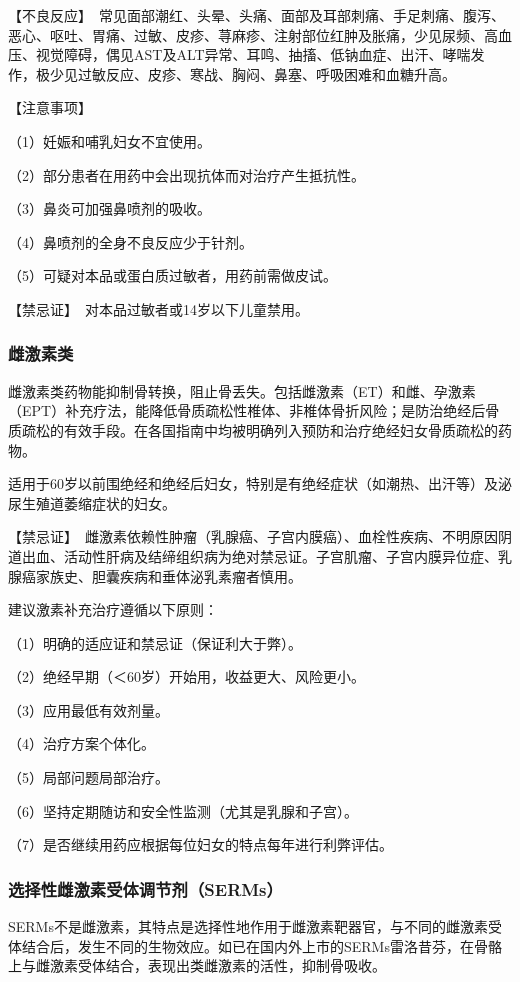 【不良反应】　常见面部潮红、头晕、头痛、面部及耳部刺痛、手足刺痛、腹泻、恶心、呕吐、胃痛、过敏、皮疹、荨麻疹、注射部位红肿及胀痛，少见尿频、高血压、视觉障碍，偶见AST及ALT异常、耳鸣、抽搐、低钠血症、出汗、哮喘发作，极少见过敏反应、皮疹、寒战、胸闷、鼻塞、呼吸困难和血糖升高。

【注意事项】

（1）妊娠和哺乳妇女不宜使用。

（2）部分患者在用药中会出现抗体而对治疗产生抵抗性。

（3）鼻炎可加强鼻喷剂的吸收。

（4）鼻喷剂的全身不良反应少于针剂。

（5）可疑对本品或蛋白质过敏者，用药前需做皮试。

【禁忌证】　对本品过敏者或14岁以下儿童禁用。

\subsubsection{雌激素类}

雌激素类药物能抑制骨转换，阻止骨丢失。包括雌激素（ET）和雌、孕激素（EPT）补充疗法，能降低骨质疏松性椎体、非椎体骨折风险；是防治绝经后骨质疏松的有效手段。在各国指南中均被明确列入预防和治疗绝经妇女骨质疏松的药物。

适用于60岁以前围绝经和绝经后妇女，特别是有绝经症状（如潮热、出汗等）及泌尿生殖道萎缩症状的妇女。

【禁忌证】　雌激素依赖性肿瘤（乳腺癌、子宫内膜癌）、血栓性疾病、不明原因阴道出血、活动性肝病及结缔组织病为绝对禁忌证。子宫肌瘤、子宫内膜异位症、乳腺癌家族史、胆囊疾病和垂体泌乳素瘤者慎用。

建议激素补充治疗遵循以下原则：

（1）明确的适应证和禁忌证（保证利大于弊）。

（2）绝经早期（＜60岁）开始用，收益更大、风险更小。

（3）应用最低有效剂量。

（4）治疗方案个体化。

（5）局部问题局部治疗。

（6）坚持定期随访和安全性监测（尤其是乳腺和子宫）。

（7）是否继续用药应根据每位妇女的特点每年进行利弊评估。

\subsubsection{选择性雌激素受体调节剂（SERMs）}

SERMs不是雌激素，其特点是选择性地作用于雌激素靶器官，与不同的雌激素受体结合后，发生不同的生物效应。如已在国内外上市的SERMs雷洛昔芬，在骨骼上与雌激素受体结合，表现出类雌激素的活性，抑制骨吸收。

